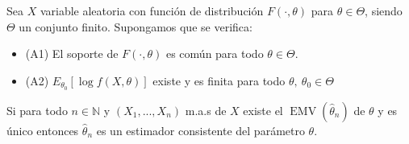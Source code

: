 \documentclass[openany]{book}
\begin{document}
\begin{theorem}
    Sea $ X $ variable aleatoria con función de distribución $ F(\cdot ,\theta) $ para $ \theta \in \Theta $, siendo $ \Theta $ un conjunto finito. Supongamos que se verifica:
    \begin{itemize}
        \item (A1) El soporte de $ F(\cdot ,\theta) $ es común para todo $ \theta \in \Theta $.
        \item (A2) $ E_{\theta_0}\left[\log{{f}({X,\theta})}\right] $ existe y es finita para todo $ \theta,\ \theta_0 \in \Theta$
        
    \end{itemize}
    Si para todo $ n \in \mathbb{N} $ y $ (X_1,...,X_n) $ m.a.s de $ X $ existe el $ \operatorname{EMV}(\hat{\theta}_{n}) $ de $ \theta $ y es único entonces $ \hat{\theta}_{n} $ es un estimador consistente del parámetro $ \theta $.
\end{theorem}
\end{document}

